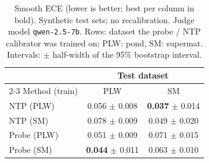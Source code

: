 \begin{table}[t]
\centering
\small
\caption{Smooth ECE (lower is better; best per column in bold). Synthetic test sets; no recalibration. Judge model \texttt{qwen-2.5-7b}. Rows: dataset the probe / NTP calibrator was trained on; PLW: pond, SM: supermat. Intervals: $\pm$ half-width of the 95\% bootstrap interval.}
\label{tab:calibration-validated-syn-smece}
\begin{tabular}{lcc}
\toprule
& \multicolumn{2}{c}{Test dataset} \\
\cmidrule(l){2-3}
Method (train) & PLW & SM \\
\midrule
NTP (PLW) & 0.056 $\pm$ 0.008 & \textbf{0.037} $\pm$ 0.014 \\
NTP (SM) & 0.078 $\pm$ 0.009 & 0.049 $\pm$ 0.020 \\
\midrule
Probe (PLW) & 0.051 $\pm$ 0.009 & 0.071 $\pm$ 0.015 \\
Probe (SM) & \textbf{0.044} $\pm$ 0.011 & 0.063 $\pm$ 0.010 \\
\bottomrule
\end{tabular}
\end{table}
